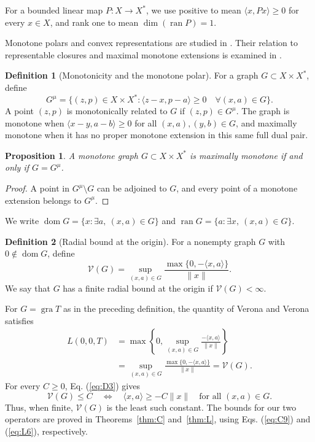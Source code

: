 \documentclass[11pt]{article}
\newcommand{\gra}{\operatorname{gra}}
\newcommand{\dom}{\operatorname{dom}}
\newcommand{\pair}[2]{\langle #1,#2\rangle}
\newtheorem{proposition}{Proposition}
\theoremstyle{definition}
\newtheorem{definition}{Definition}
\theoremstyle{remark}
\begin{document}
For a bounded linear map $P:X\to X^*$, we use positive to mean $\pair{x}{Px}\ge0$ for every $x\in X$, and rank one to mean $\dim(\operatorname{ran}P)=1$.

Monotone polars and convex representations are studied in \cite{martinezsvaiter2005,bauschkemclarensendov2006}. Their relation to representable closures and maximal monotone extensions is examined in \cite{buenomartinezsvaiter2014}.

\begin{definition}[Monotonicity and the monotone polar]
For a graph $G\subset X\times X^*$, define
\begin{equation}
G^\mu=\{(z,p)\in X\times X^*:
 \pair{z-x}{p-a}\ge0\quad\forall(x,a)\in G\}.
\label{eq:D1}
\end{equation}
A point $(z,p)$ is monotonically related to $G$ if $(z,p)\in G^\mu$.
The graph is monotone when $\pair{x-y}{a-b}\ge0$ for all $(x,a),(y,b)\in G$, and maximally monotone when it has no proper monotone extension in this same full dual pair.
\end{definition}

\begin{proposition}
A monotone graph $G\subset X\times X^*$ is maximally monotone if and only if $G=G^\mu$.
\end{proposition}
\begin{proof}
A point in $G^\mu\setminus G$ can be adjoined to $G$, and every point of a monotone extension belongs to $G^\mu$.
\end{proof}

We write $\dom G=\{x:\exists a,\ (x,a)\in G\}$ and $\operatorname{ran}G=\{a:\exists x,\ (x,a)\in G\}$.


\begin{definition}[Radial bound at the origin]
\label{def:radial-bound}
For a nonempty graph $G$ with $0\notin\dom G$, define
\begin{equation}
\mathcal V(G)=\sup_{(x,a)\in G}
 \frac{\max\{0,-\pair{x}{a}\}}{\|x\|}.
\label{eq:D3}
\end{equation}
We say that $G$ has a finite radial bound at the origin if $\mathcal V(G)<\infty$.
\end{definition}
For $G=\gra T$ as in the preceding definition, the quantity of Verona and Verona \cite[p.~1004]{verona2008} satisfies
\[
\begin{aligned}
L(0,0,T)
&=\max\left\{0,\sup_{(x,a)\in G}\frac{-\pair{x}{a}}{\|x\|}\right\}\\
&=\sup_{(x,a)\in G}\frac{\max\{0,-\pair{x}{a}\}}{\|x\|}
=\mathcal V(G).
\end{aligned}
\]
For every $C\ge0$, Eq. (\ref{eq:D3}) gives
\[
\mathcal V(G)\le C
\quad\Longleftrightarrow\quad
\pair{x}{a}\ge-C\|x\|\quad\text{for all }(x,a)\in G.
\]
Thus, when finite, $\mathcal V(G)$ is the least such constant. The bounds for our two operators are proved in Theorems~\ref{thm:C} and~\ref{thm:L}, using Eqs. (\ref{eq:C9}) and (\ref{eq:L6}), respectively.
\end{document}
